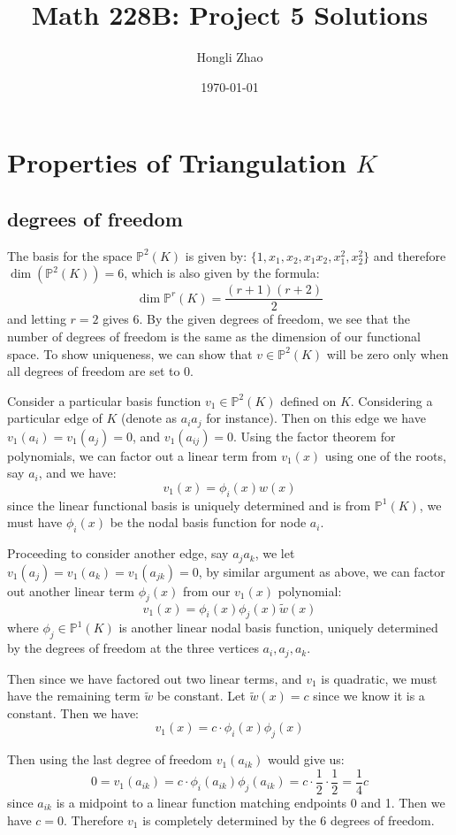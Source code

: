 \documentclass[12pt]{article} %
\author{Hongli Zhao}
\title{Math 228B: Project 5 Solutions}
\date{\today}
\newcommand{\1}[1]{\mathds{1}\left[#1\right]}
\begin{document}
\maketitle
\section{Properties of Triangulation $K$}
\subsection{degrees of freedom}
The basis for the space $\mathbb{P}^2(K)$ is given by:
$\{1,x_1,x_2,x_1x_2,x_1^2,x_2^2\}$ and therefore $\dim(\mathbb{P}^2(K)) = 6$, which is also given by the formula:
$$
	\dim\mathbb{P}^r({K}) = \frac{(r+1)(r+2)}{2}
$$ and letting $r=2$ gives 6. By the given degrees of freedom, we see that the number of degrees of freedom is the same as the dimension of our functional space. To show uniqueness, we can show that $v\in\mathbb{P}^2(K)$ will be zero only when all degrees of freedom are set to 0.

Consider a particular basis function $v_{1}\in\mathbb{P}^2(K)$ defined on $K$. Considering a particular edge of $K$ (denote as $a_ia_j$ for instance). Then on this edge we have $v_1(a_i) = v_1(a_j) = 0$, and $v_1(a_{ij}) = 0$. Using the factor theorem for polynomials, we can factor out a linear term from $v_1(x)$ using one of the roots, say $a_i$, and we have:
$$
	v_1(x) = \phi_i(x)w(x)
$$ since the linear functional basis is uniquely determined and is from $\mathbb{P}^1(K)$, we must have $\phi_i(x)$ be the nodal basis function for node $a_i$.

Proceeding to consider another edge, say $a_{j}a_{k}$, we let $v_1(a_j) = v_1(a_k) = v_1(a_{jk}) = 0$, by similar argument as above, we can factor out another linear term $\phi_j(x)$ from our $v_1(x)$ polynomial:
$$
	v_1(x) = \phi_i(x)\phi_j(x)\tilde{w}(x)
$$ where $\phi_j \in \mathbb{P}^1(K)$ is another linear nodal basis function, uniquely determined by the degrees of freedom at the three vertices $a_i, a_j, a_k$.

Then since we have factored out two linear terms, and $v_1$ is quadratic, we must have the remaining term $\tilde{w}$ be constant. Let $\tilde{w}(x) = c$ since we know it is a constant. Then we have:
$$
	v_1(x) = c\cdot\phi_{i}(x)\phi_j(x)
$$

Then using the last degree of freedom $v_1(a_{ik})$ would give us:
$$
	0 = v_1(a_{ik}) = c\cdot\phi_{i}(a_{ik})\phi_{j}(a_{ik}) = c\cdot\frac12\cdot\frac12 = \frac14 c
$$ since $a_{ik}$ is a midpoint to a linear function matching endpoints 0 and 1. Then we have $c = 0$. Therefore $v_1$ is completely determined by the 6 degrees of freedom.
\end{document}
